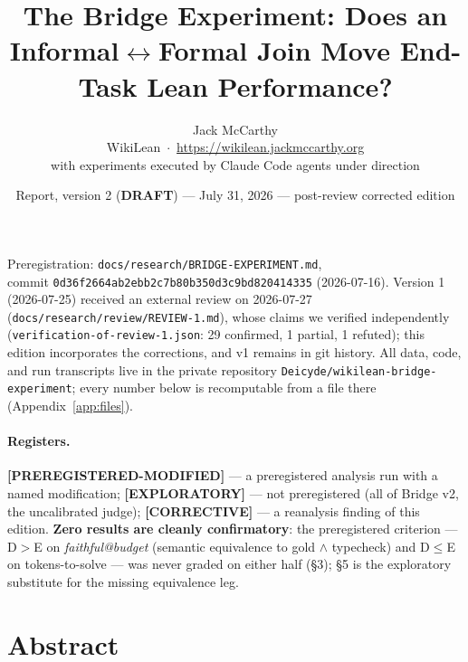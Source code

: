 \documentclass[10pt]{article}
\title{\textbf{The Bridge Experiment: Does an Informal$\leftrightarrow$Formal
Join Move End-Task Lean Performance?}}
\author{Jack McCarthy\\
\normalsize WikiLean \,$\cdot$\, \url{https://wikilean.jackmccarthy.org}\\
\normalsize with experiments executed by Claude Code agents under direction}
\date{Report, version 2 (\textbf{DRAFT}) --- July 31, 2026 --- post-review
corrected edition}
\newcommand{\code}[1]{\texttt{#1}}
\begin{document}
\maketitle
\thispagestyle{plain}

\begin{center}
\end{center}

\begin{center}
\begin{minipage}{0.92\textwidth}
\small
Preregistration: \code{docs/research/BRIDGE-EXPERIMENT.md},\\
commit \code{0d36f2664ab2ebb2c7b80b350d3c9bd820414335} (2026-07-16). Version 1
(2026-07-25) received an external review on 2026-07-27
(\code{docs/research/review/REVIEW-1.md}), whose claims we verified
independently (\code{verification-of-review-1.json}: 29 confirmed,
1 partial, 1 refuted); this edition incorporates the corrections, and v1
remains in git history. All data, code, and run transcripts live in the
private repository \code{Deicyde/wikilean-bridge-experiment}; every number
below is recomputable from a file there (Appendix~\ref{app:files}).
\end{minipage}
\end{center}

\paragraph{Registers.} \textbf{[PREREGISTERED-MODIFIED]} --- a
preregistered analysis run with a named modification;
\textbf{[EXPLORATORY]} --- not preregistered (all of Bridge v2, the
uncalibrated judge); \textbf{[CORRECTIVE]} --- a reanalysis finding of
this edition. \textbf{Zero results are cleanly confirmatory}: the
preregistered criterion --- D$>$E on \emph{faithful@budget} (semantic
equivalence to gold $\wedge$ typecheck) and D$\leq$E on tokens-to-solve
--- was never graded on either half (\S3); \S5 is the exploratory
substitute for the missing equivalence leg.

\section{Abstract}\label{sec:abstract}
\end{document}
